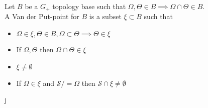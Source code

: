 \documentclass[../main.tex]{subfiles}
\begin{document}
\begin{defn}
	Let $B$ be a $G_+$ topology base such that $\Omega,\Theta \in B \implies \Omega\cap \Theta \in B$.\\
	A Van der Put-point for $B$ is a subset $\xi \subset B$ such that
	\begin{itemize}
	\item $\Omega\in \xi, \Theta \in B, \Omega \subset \Theta \implies \Theta \in \xi$
	\item If $\Omega,\Theta$ then $\Omega\cap \Theta \in \xi$ 
	\item $\xi \neq \emptyset$ 
	\item If $\Omega\in \xi$ and $ \mathcal{S}/=\Omega $ then $ \mathcal{S} \cap \xi\neq \emptyset$ 
	\end{itemize}
	
\end{defn}


			j
\end{document}
